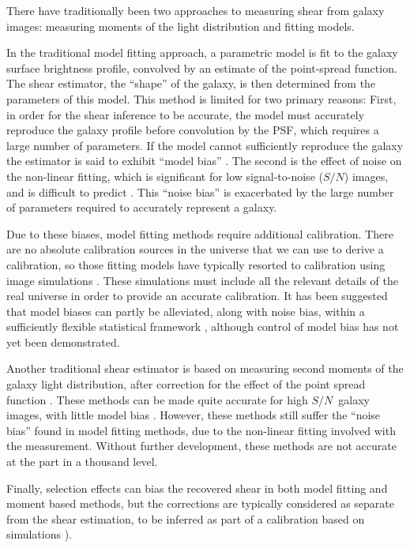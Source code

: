 \documentclass[iop]{emulateapj}
\newcommand{\snr}{$S/N$}
\begin{document}
There have traditionally been two approaches to measuring shear from
galaxy images: measuring moments of the light distribution and fitting models.

In the traditional model fitting approach, a parametric model is fit to the
galaxy surface brightness profile, convolved by an estimate of the point-spread
function.  The shear estimator, the ``shape'' of the galaxy, is then determined
from the parameters of this model.  This method is limited for two primary
reasons: First, in order for the shear inference to be accurate, the model must
accurately reproduce the galaxy profile before convolution by the PSF, which
requires a large number of parameters.  If the model cannot sufficiently
reproduce the galaxy the estimator is said to exhibit ``model bias''
\citep{Bernstein2010}.  The second is the effect of noise on the non-linear
fitting, which is significant for low signal-to-noise (\snr) images, and is
difficult to predict \citep{HirataAlign04,Refreg12,Melchior12}.  This ``noise
bias'' is exacerbated by the large number of parameters required to accurately
represent a galaxy.

Due to these biases, model fitting methods require additional calibration.
There are no absolute calibration sources in the universe that we can use to
derive a calibration, so those fitting models have typically resorted to
calibration using image simulations
\citep[e.g.][]{Zuntz13,Miller13,KidsShear2016,Refregier13,Jee16}.  These simulations
must include all the relevant details of the real universe in order to provide
an accurate calibration.  It has been suggested that model biases can partly be
alleviated, along with noise bias, within a sufficiently flexible statistical
framework \citep{SchneiderProbshear2015}, although control of model bias has not
yet been demonstrated.

Another traditional shear estimator is based on measuring second moments of the
galaxy light distribution, after correction for the effect of the point spread
function \citep[e.g.][]{ksb95,Bernstein2010}.  These methods can be made quite
accurate for high \snr\ galaxy images, with little model bias
\citep{Bernstein2010,Okura2016}.  However, these methods still suffer the
``noise bias'' found in model fitting methods, due to the non-linear fitting
involved with the measurement.  Without further development, these methods are
not accurate at the part in a thousand level.

Finally, selection effects can bias the recovered shear in both model fitting
and moment based methods, but the corrections are typically considered as
separate from the shear estimation, to be inferred as part of a calibration
based on simulations \citep{Jarvis2016,KidsShear2016}).
\end{document}
